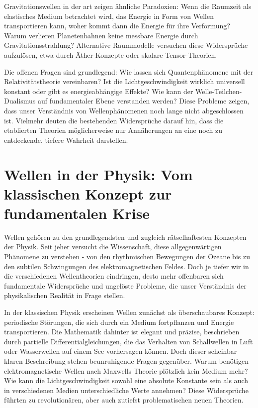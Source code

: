 Gravitationswellen \cite{LIGO2016} in der \gls{art} zeigen ähnliche Paradoxien: Wenn die Raumzeit als elastisches Medium betrachtet wird, das Energie in Form von Wellen transportieren kann, woher kommt
dann die Energie für ihre Verformung? Warum verlieren Planetenbahnen keine messbare Energie durch Gravitationsstrahlung? Alternative Raummodelle versuchen diese Widersprüche aufzulösen,
etwa durch Äther-Konzepte oder skalare Tensor-Theorien.

Die offenen Fragen sind grundlegend: Wie lassen sich Quantenphänomene mit der Relativitätstheorie vereinbaren? Ist die Lichtgeschwindigkeit wirklich universell konstant oder gibt es
energieabhängige Effekte? Wie kann der Welle-Teilchen-Dualismus auf fundamentaler Ebene verstanden werden? Diese Probleme zeigen, dass unser Verständnis von Wellenphänomenen noch lange
nicht abgeschlossen ist. Vielmehr deuten die bestehenden Widersprüche darauf hin, dass die etablierten Theorien möglicherweise nur Annäherungen an eine noch zu entdeckende, tiefere
Wahrheit darstellen.

\section{Wellen in der Physik: Vom klassischen Konzept zur fundamentalen Krise}
Wellen gehören zu den grundlegendsten und zugleich rätselhaftesten Konzepten der Physik. Seit jeher versucht die Wissenschaft, diese allgegenwärtigen Phänomene zu verstehen - von den
rhythmischen Bewegungen der Ozeane bis zu den subtilen Schwingungen des elektromagnetischen Feldes. Doch je tiefer wir in die verschiedenen Wellentheorien eindringen, desto mehr offenbaren
sich fundamentale Widersprüche und ungelöste Probleme, die unser Verständnis der physikalischen Realität in Frage stellen.

In der klassischen Physik erscheinen Wellen zunächst als überschaubares Konzept: periodische Störungen, die sich durch ein Medium fortpflanzen und Energie transportieren. Die Mathematik
dahinter ist elegant und präzise, beschrieben durch partielle Differentialgleichungen, die das Verhalten von Schallwellen in Luft oder Wasserwellen auf einem See vorhersagen können.
Doch dieser scheinbar klaren Beschreibung stehen beunruhigende Fragen gegenüber. Warum benötigen elektromagnetische Wellen nach Maxwells Theorie plötzlich kein Medium mehr? Wie kann die
Lichtgeschwindigkeit sowohl eine absolute Konstante sein als auch in verschiedenen Medien unterschiedliche Werte annehmen? Diese Widersprüche führten zu revolutionären, aber auch zutiefst
problematischen neuen Theorien.

